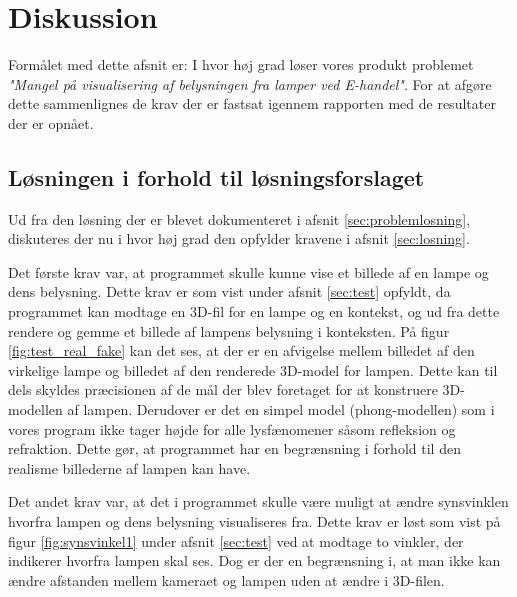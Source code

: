 \section{Diskussion}
\label{sec:diskussion}

Formålet med dette afsnit er: I hvor høj grad løser vores produkt problemet \textit{"Mangel på visualisering af belysningen fra lamper ved E-handel"}. For at afgøre dette sammenlignes de krav der er fastsat igennem rapporten med de resultater der er opnået. 

\subsection{Løsningen i forhold til løsningsforslaget}

Ud fra den løsning der er blevet dokumenteret i afsnit \ref{sec:problemlosning}, diskuteres der nu i hvor høj grad den opfylder kravene i afsnit \ref{sec:losning}. 

Det første krav var, at programmet skulle kunne vise et billede af en lampe og dens belysning. Dette krav er som vist under afsnit \ref{sec:test} opfyldt, da programmet kan modtage en 3D-fil for en lampe og en kontekst, og ud fra dette rendere og gemme et billede af lampens belysning i konteksten. På figur \ref{fig:test_real_fake} kan det ses, at der er en afvigelse mellem billedet af den virkelige lampe og billedet af den renderede 3D-model for lampen. Dette kan til dels skyldes præcisionen af de mål der blev foretaget for at konstruere 3D-modellen af lampen. Derudover er det en simpel model (phong-modellen) som i vores program ikke tager højde for alle lysfænomener såsom refleksion og refraktion. Dette gør, at programmet har en begrænsning i forhold til den realisme billederne af lampen kan have.

Det andet krav var, at det i programmet skulle være muligt at ændre synsvinklen hvorfra lampen og dens belysning visualiseres fra. Dette krav er løst som vist på figur \ref{fig:synsvinkel1} under afsnit \ref{sec:test} ved at modtage to vinkler, der indikerer hvorfra lampen skal ses. Dog er der en begrænsning i, at man ikke kan ændre afstanden mellem kameraet og lampen uden at ændre i 3D-filen. 

